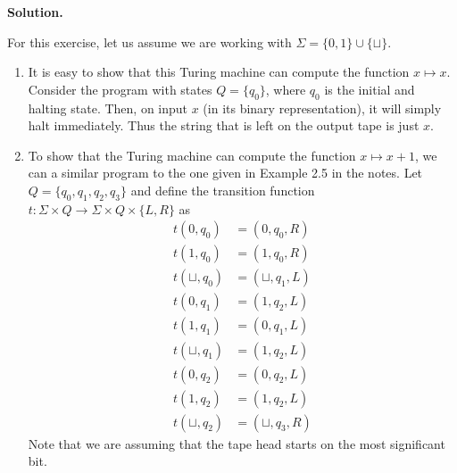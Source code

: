 \documentclass{article}
\newcommand{\solution}{\noindent \textbf{Solution.}}
\begin{document}
\vspace{3mm}
\solution

For this exercise, let us assume we are working with $\Sigma = \{0, 1\} \cup \{\sqcup\}$.

\begin{enumerate}
    \item It is easy to show that this Turing machine can compute the function $x \mapsto x$.
    Consider the program with states $Q = \{q_0\}$, where $q_0$ is the initial and halting state.
    Then, on input $x$ (in its binary representation), it will simply halt immediately.
    Thus the string that is left on the output tape is just $x$.
    \item To show that the Turing machine can compute the function $x \mapsto x+1$, we can a similar program to the one given in Example 2.5 in the notes.
    Let $Q = \{q_0, q_1, q_2, q_3\}$ and define the transition function $t : \Sigma \times Q \to \Sigma \times Q \times \{L, R\}$ as
    \begin{align*}
        t(0, q_0) &= (0, q_0, R) \\
        t(1, q_0) &= (1, q_0, R) \\
        t(\sqcup, q_0) &= (\sqcup, q_1, L) \\
        t(0, q_1) &= (1, q_2, L) \\
        t(1, q_1) &= (0, q_1, L) \\
        t(\sqcup, q_1) &= (1, q_2, L) \\
        t(0, q_2) &= (0, q_2, L) \\
        t(1, q_2) &= (1, q_2, L) \\
        t(\sqcup, q_2) &= (\sqcup, q_3, R)
    \end{align*}
    Note that we are assuming that the tape head starts on the most significant bit.
    

\end{enumerate}
\end{document}
